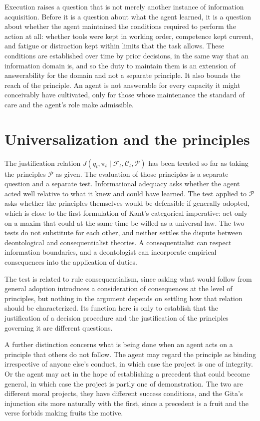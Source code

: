 \documentclass[11pt]{article}
\newcommand{\F}{\mathcal F}
\newcommand{\C}{\mathcal C}
\theoremstyle{definition}
\begin{document}
Execution raises a question that is not merely another instance of information acquisition. Before it is a question about what the agent learned, it is a question about whether the agent maintained the conditions required to perform the action at all: whether tools were kept in working order, competence kept current, and fatigue or distraction kept within limits that the task allows. These conditions are established over time by prior decisions, in the same way that an information domain is, and so the duty to maintain them is an extension of answerability for the domain and not a separate principle. It also bounds the reach of the principle. An agent is not answerable for every capacity it might conceivably have cultivated, only for those whose maintenance the standard of care and the agent's role make admissible.

\section{Universalization and the principles}

The justification relation $J(q_t,\pi_t\mid\F_t,\C_t,\mathcal P)$ has been treated so far as taking the principles $\mathcal P$ as given. The evaluation of those principles is a separate question and a separate test. Informational adequacy asks whether the agent acted well relative to what it knew and could have learned. The test applied to $\mathcal P$ asks whether the principles themselves would be defensible if generally adopted, which is close to the first formulation of Kant's categorical imperative: act only on a maxim that could at the same time be willed as a universal law. The two tests do not substitute for each other, and neither settles the dispute between deontological and consequentialist theories. A consequentialist can respect information boundaries, and a deontologist can incorporate empirical consequences into the application of duties.

The test is related to rule consequentialism, since asking what would follow from general adoption introduces a consideration of consequences at the level of principles, but nothing in the argument depends on settling how that relation should be characterized. Its function here is only to establish that the justification of a decision procedure and the justification of the principles governing it are different questions.

A further distinction concerns what is being done when an agent acts on a principle that others do not follow. The agent may regard the principle as binding irrespective of anyone else's conduct, in which case the project is one of integrity. Or the agent may act in the hope of establishing a precedent that could become general, in which case the project is partly one of demonstration. The two are different moral projects, they have different success conditions, and the Gita's injunction sits more naturally with the first, since a precedent is a fruit and the verse forbids making fruits the motive.
\end{document}
